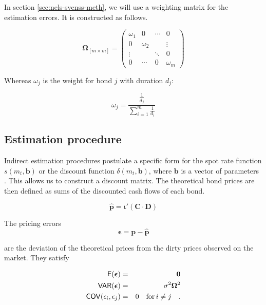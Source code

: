 In section \ref{sec:nels-svenss-meth}, we will use a weighting matrix for the estimation errors. It is constructed  as follows.

\begin{equation}\label{weights}
    \bm{\Omega}_{\left[m\times m\right]}= \begin{pmatrix}
 \omega_1 & 0 &\cdots  &0  \\
 0 & \omega_2 &  & \vdots \\
 \vdots &  & \ddots & 0 \\
 0 &\cdots  &0  & \omega_m
\end{pmatrix}
\end{equation}


Whereas $\omega_j$ is the weight for bond $j$ with duration $d_j$:

\begin{displaymath}
    \omega_j=\frac{\frac{1}{d_j}}{\sum_{i=1}^m\frac{1}{d_i}}
\end{displaymath}



\subsection{Estimation procedure}
\label{sec:estimation}

Indirect estimation procedures postulate a specific form for the spot rate function $s(m_t, \bm{b})$ or the discount function $\delta(m_t, \bm{b})$, where $\bm{b}$ is a vector of parameters \citep[see, e.g.][]{Martellini2003}. This allows us to construct a discount matrix. The theoretical bond prices are then defined as sums of the discounted cash flows of each bond.

\begin{equation}
  \label{eq:theorprices}
  \bm{\hat{p}} = \bm{\iota}'(\bm{C}\cdot\bm{D})
\end{equation}



The pricing errors
\begin{equation}
  \label{eq:pricingerrors}
  \bm{\epsilon} = \bm{p-\hat{p}}
\end{equation}

are the deviation of the theoretical prices from the dirty prices observed on the market. They satisfy

\begin{eqnarray}
  \label{eq:residuals}
  \mathsf{E}(\bm{\epsilon}) &=& \bm{0}\\
  \mathsf{VAR}(\bm{\epsilon}) &=&\sigma^2\bm{\Omega}^2 \\
  \mathsf{COV}(\epsilon_i, \epsilon_j) &=& 0 \quad \mbox{for}\,i\neq j\quad .
\end{eqnarray}

